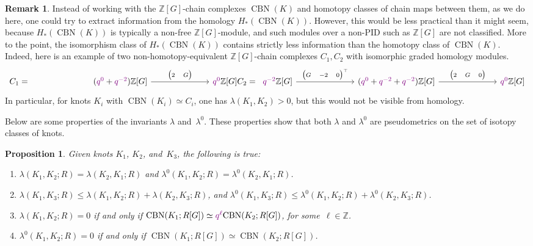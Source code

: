 \documentclass[11pt,a4paper,twoside]{amsart}
\newtheorem{proposition}[theorem]{Proposition}
\theoremstyle{definition}
\newtheorem{remark}[theorem]{Remark}
\def\\{}%
\def\lambda{λ}%
\newcommand{\lambdau}{\lambda^0}
\newcommand{\BNr}{{\operatorname{CBN}}}%
\newcommand{\Z}{\mathbb{Z}}
\newcommand{\QGrad}[1]{{\textcolor{violet}{#1}}}
\begin{document}
\begin{remark}
Instead of working with the $\Z[G]$-chain complexes $\BNr(K)$ and homotopy classes of chain maps between them, as we do here, one could try to extract information from the homology $H_*(\BNr(K))$. 
However, this would be less practical than it might seem,
because $H_*(\BNr(K))$ is typically a non-free $\Z[G]$-module, and such modules over a non-PID such as $\Z[G]$ are not classified. More to the point, the isomorphism class of $H_*(\BNr(K))$ contains strictly less information than the homotopy class of $\BNr(K)$. Indeed, here is an example of two non-homotopy-equivalent $\Z[G]$-chain complexes $C_1, C_2$ with isomorphic graded homology modules.
\[
\begin{tikzcd}[column sep=7em,ampersand replacement=\&]
C_1 = \&[-7em]\&
(\QGrad{q^0} + \QGrad{q^{-2}})\Z[G]
\ar{r}{\begin{pmatrix}2&G\end{pmatrix}}
\& \QGrad{q^0}\Z[G] 
\\
C_2 = \&[-7em]
  \QGrad{q^{-2}}\Z[G] \ar{r}{\begin{pmatrix}G&-2&0\end{pmatrix}^{\top}}
\& (\QGrad{q^0}+\QGrad{q^{-2}}+\QGrad{q^{-2}})\Z[G] \ar{r}{\begin{pmatrix}2&G&0\end{pmatrix}}
\& \QGrad{q^0}\Z[G]
\end{tikzcd}
\]
In particular, for knots $K_i$ with $\BNr(K_i) \simeq C_i$, one has $\lambda(K_1, K_2) > 0$, but this would not be visible from homology.
\end{remark}

Below are some properties of the invariants $\lambda$ and~$\lambdau$. These properties show that both $\lambda$ and $\lambdau$ are pseudometrics on the set of isotopy classes of knots.

\begin{proposition}\label{prop:properties_lambda}
	Given knots \(K_1\), \(K_2\), and~\(K_3\), the following is true:
	\begin{enumerate}[label=(\roman*)]
		\item \label{item:properties_lambda:1} \(\lambda(K_1,K_2;R)=\lambda(K_2,K_1;R)\) and \(\lambdau(K_1,K_2;R)=\lambdau(K_2,K_1;R)\).
		\item \label{item:properties_lambda:2} \(\lambda(K_1,K_3;R)\leq \lambda(K_1,K_2;R) + \lambda(K_2,K_3;R)\), and\\
                      \(\lambdau(K_1,K_3;R)\leq \lambdau(K_1,K_2;R) + \lambdau(K_2,K_3;R)\).
		\item \label{item:properties_lambda:3} \(\lambda(K_1,K_2;R)=0\) if and only if \(\BNr(K_1;R[G]) \simeq \QGrad{q^\ell} \BNr(K_2;R[G])\), for some~\(\ell \in \Z\).
		\item \label{item:properties_lambda:4} \(\lambdau(K_1,K_2;R)=0\) if and only if \(\BNr(K_1;R[G]) \simeq \BNr(K_2;R[G])\).
	\end{enumerate}
\end{proposition}
\end{document}
